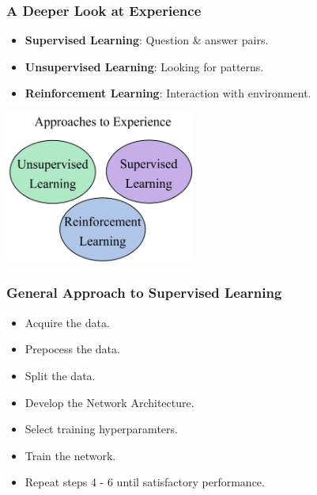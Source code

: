 \documentclass{beamer}
\begin{document}
\begin{frame}

    \frametitle{A Deeper Look at Experience}

    \begin{itemize}
        \item \textbf{Supervised Learning}: Question \& answer pairs.
        \item \textbf{Unsupervised Learning}: Looking for patterns.
        \item \textbf{Reinforcement Learning}: Interaction with environment.
    \end{itemize}

    \begin{center}
        \includegraphics[height=5cm]{figs/experience.png}
    \end{center}

\end{frame}


\begin{frame}

    \frametitle{General Approach to Supervised Learning}

    \begin{itemize}
        \item Acquire the data.
        \item Prepocess the data.
        \item Split the data.
        \item Develop the Network Architecture.
        \item Select training hyperparamters.
        \item Train the network.
        \item Repeat steps 4 - 6 until satisfactory performance.
    \end{itemize}

\end{frame}
\end{document}
